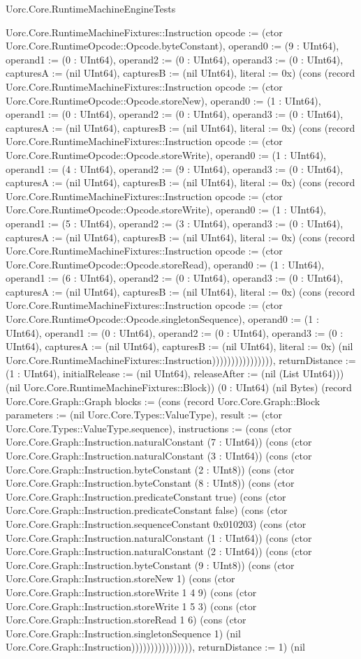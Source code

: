 \begin{lexlean}{Uorc.Core.RuntimeMachineEngineTests}
\begin{semanticmodule}
{Uorc.Core.RuntimeMachineFixtures::Instruction {opcode := (ctor Uorc.Core.RuntimeOpcode::Opcode.byteConstant), operand0 := (9 : UInt64), operand1 := (0 : UInt64), operand2 := (0 : UInt64), operand3 := (0 : UInt64), capturesA := (nil UInt64), capturesB := (nil UInt64), literal := 0x}) (cons (record Uorc.Core.RuntimeMachineFixtures::Instruction {opcode := (ctor Uorc.Core.RuntimeOpcode::Opcode.storeNew), operand0 := (1 : UInt64), operand1 := (0 : UInt64), operand2 := (0 : UInt64), operand3 := (0 : UInt64), capturesA := (nil UInt64), capturesB := (nil UInt64), literal := 0x}) (cons (record Uorc.Core.RuntimeMachineFixtures::Instruction {opcode := (ctor Uorc.Core.RuntimeOpcode::Opcode.storeWrite), operand0 := (1 : UInt64), operand1 := (4 : UInt64), operand2 := (9 : UInt64), operand3 := (0 : UInt64), capturesA := (nil UInt64), capturesB := (nil UInt64), literal := 0x}) (cons (record Uorc.Core.RuntimeMachineFixtures::Instruction {opcode := (ctor Uorc.Core.RuntimeOpcode::Opcode.storeWrite), operand0 := (1 : UInt64), operand1 := (5 : UInt64), operand2 := (3 : UInt64), operand3 := (0 : UInt64), capturesA := (nil UInt64), capturesB := (nil UInt64), literal := 0x}) (cons (record Uorc.Core.RuntimeMachineFixtures::Instruction {opcode := (ctor Uorc.Core.RuntimeOpcode::Opcode.storeRead), operand0 := (1 : UInt64), operand1 := (6 : UInt64), operand2 := (0 : UInt64), operand3 := (0 : UInt64), capturesA := (nil UInt64), capturesB := (nil UInt64), literal := 0x}) (cons (record Uorc.Core.RuntimeMachineFixtures::Instruction {opcode := (ctor Uorc.Core.RuntimeOpcode::Opcode.singletonSequence), operand0 := (1 : UInt64), operand1 := (0 : UInt64), operand2 := (0 : UInt64), operand3 := (0 : UInt64), capturesA := (nil UInt64), capturesB := (nil UInt64), literal := 0x}) (nil Uorc.Core.RuntimeMachineFixtures::Instruction)))))))))))))))), returnDistance := (1 : UInt64), initialRelease := (nil UInt64), releaseAfter := (nil (List UInt64))}) (nil Uorc.Core.RuntimeMachineFixtures::Block)) (0 : UInt64) (nil Bytes) (record Uorc.Core.Graph::Graph {blocks := (cons (record Uorc.Core.Graph::Block {parameters := (nil Uorc.Core.Types::ValueType), result := (ctor Uorc.Core.Types::ValueType.sequence), instructions := (cons (ctor Uorc.Core.Graph::Instruction.naturalConstant (7 : UInt64)) (cons (ctor Uorc.Core.Graph::Instruction.naturalConstant (3 : UInt64)) (cons (ctor Uorc.Core.Graph::Instruction.byteConstant (2 : UInt8)) (cons (ctor Uorc.Core.Graph::Instruction.byteConstant (8 : UInt8)) (cons (ctor Uorc.Core.Graph::Instruction.predicateConstant true) (cons (ctor Uorc.Core.Graph::Instruction.predicateConstant false) (cons (ctor Uorc.Core.Graph::Instruction.sequenceConstant 0x010203) (cons (ctor Uorc.Core.Graph::Instruction.naturalConstant (1 : UInt64)) (cons (ctor Uorc.Core.Graph::Instruction.naturalConstant (2 : UInt64)) (cons (ctor Uorc.Core.Graph::Instruction.byteConstant (9 : UInt8)) (cons (ctor Uorc.Core.Graph::Instruction.storeNew 1) (cons (ctor Uorc.Core.Graph::Instruction.storeWrite 1 4 9) (cons (ctor Uorc.Core.Graph::Instruction.storeWrite 1 5 3) (cons (ctor Uorc.Core.Graph::Instruction.storeRead 1 6) (cons (ctor Uorc.Core.Graph::Instruction.singletonSequence 1) (nil Uorc.Core.Graph::Instruction)))))))))))))))), returnDistance := 1}) (nil }
\end{semanticmodule}
\end{lexlean}
